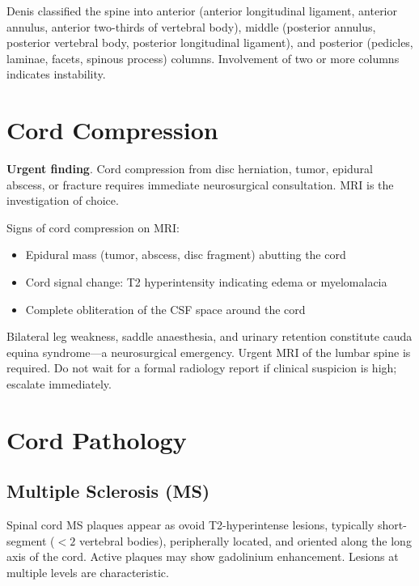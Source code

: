 \begin{pearlbox}
Denis classified the spine into anterior (anterior longitudinal ligament, anterior annulus, anterior two-thirds of vertebral body), middle (posterior annulus, posterior vertebral body, posterior longitudinal ligament), and posterior (pedicles, laminae, facets, spinous process) columns. Involvement of two or more columns indicates instability.
\end{pearlbox}


\section{Cord Compression}
\textbf{Urgent finding}. Cord compression from disc herniation, tumor, epidural abscess, or fracture requires immediate neurosurgical consultation. MRI is the investigation of choice.

Signs of cord compression on MRI:
\begin{itemize}
  \item Epidural mass (tumor, abscess, disc fragment) abutting the cord
  \item Cord signal change: T2 hyperintensity indicating edema or myelomalacia
  \item Complete obliteration of the CSF space around the cord
\end{itemize}

\begin{pearlbox}
Bilateral leg weakness, saddle anaesthesia, and urinary retention constitute cauda equina syndrome---a neurosurgical emergency. Urgent MRI of the lumbar spine is required. Do not wait for a formal radiology report if clinical suspicion is high; escalate immediately.
\end{pearlbox}


\section{Cord Pathology}

\subsection{Multiple Sclerosis (MS)}
Spinal cord MS plaques appear as ovoid T2-hyperintense lesions, typically short-segment ($< 2$ vertebral bodies), peripherally located, and oriented along the long axis of the cord. Active plaques may show gadolinium enhancement. Lesions at multiple levels are characteristic.

